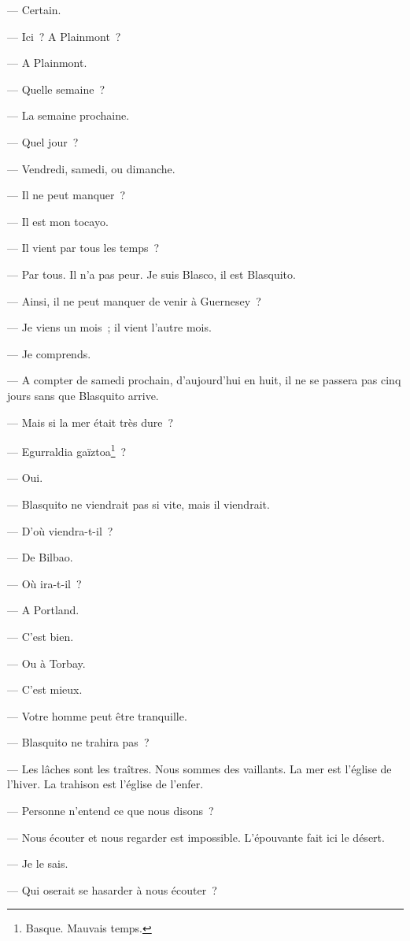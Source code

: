 \documentclass[french,twoside]{book} %
\begin{document}
{ — Certain.\par
 — Ici ? A Plainmont ?\par
 — A Plainmont.\par
 — Quelle semaine ?\par
 — La semaine prochaine.\par
 — Quel jour ?\par
 — Vendredi, samedi, ou dimanche.\par
 — Il ne peut manquer ?\par
 — Il est mon tocayo.\par
 — Il vient par tous les temps ?\par
 — Par tous. Il n’a pas peur. Je suis Blasco, il est Blasquito.\par
 — Ainsi, il ne peut manquer de venir à Guernesey ?\par
 — Je viens un mois ; il vient l’autre mois.\par
 — Je comprends.\par
 — A compter de samedi prochain, d’aujourd’hui en huit, il ne se passera pas cinq jours sans que Blasquito arrive.\par
 — Mais si la mer était très dure ?\par
 — Egurraldia gaïztoa\footnote{ \noindent Basque. Mauvais temps.
 } ?\par
 — Oui.\par
 — Blasquito ne viendrait pas si vite, mais il viendrait.\par
 — D’où viendra-t-il ?\par
 — De Bilbao.\par
 — Où ira-t-il ?\par
 — A Portland.\par
 — C’est bien.\par
 — Ou à Torbay.\par
 — C’est mieux.\par
 — Votre homme peut être tranquille.\par
 — Blasquito ne trahira pas ?\par
 — Les lâches sont les traîtres. Nous sommes des vaillants. La mer est l’église de l’hiver. La trahison est l’église de l’enfer.\par
 — Personne n’entend ce que nous disons ?\par
 — Nous écouter et nous regarder est impossible. L’épouvante fait ici le désert.\par
 — Je le sais.\par
 — Qui oserait se hasarder à nous écouter ?\par
}
\end{document}
